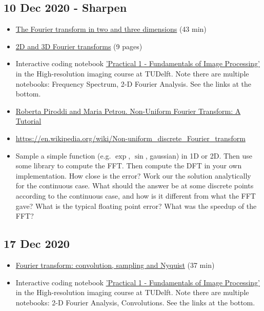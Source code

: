 \documentclass[11pt, oneside]{article}   	%
\begin{document}
\subsection{10 Dec 2020 - Sharpen}
\begin{itemize}
\item \href{https://youtu.be/J1ViNmmQnd0}{The Fourier transform in two and three dimensions} (43 min)
	\item \href{https://cryoemprinciples.yale.edu/sites/default/files/files/4%20Fourier2D-3D.pdf}{2D and 3D Fourier transforms} (9 pages)
	\item Interactive coding notebook \href{https://gitlab.tudelft.nl/aj-lab/teaching/-/wikis/NB4020}{'Practical 1 - Fundamentals of Image Processing'} in the High-resolution imaging course at TUDelft. Note there are multiple notebooks: Frequency Spectrum, 2-D Fourier Analysis. See the links at the bottom.
	\item \href{http://homepages.inf.ed.ac.uk/rbf/CVonline/LOCAL_COPIES/PIRODDI1/NUFT/NUFT.html}{Roberta Piroddi and Maria Petrou. Non-Uniform Fourier Transform: A Tutorial}
	\item \url{https://en.wikipedia.org/wiki/Non-uniform_discrete_Fourier_transform}
	
\end{itemize}
\begin{itemize}
	\item Sample a simple function (e.g. $\exp$, $\sin$, gaussian) in 1D or 2D. Then use some library to compute the FFT. Then compute the DFT in your own implementation. How close is the error? Work our the solution analytically for the continuous case. What should the answer be at some discrete points according to the continuous case, and how is it different from what the FFT gave? What is the typical floating point error? What was the speedup of the FFT?
\end{itemize}

\pagebreak
\subsection{17 Dec 2020}
\begin{itemize}
	\item \href{https://youtu.be/_F-YDwY9X30}{Fourier transform: convolution, sampling and Nyquist} (37 min)
	\item Interactive coding notebook \href{https://gitlab.tudelft.nl/aj-lab/teaching/-/wikis/NB4020}{'Practical 1 - Fundamentals of Image Processing'} in the High-resolution imaging course at TUDelft. Note there are multiple notebooks: 2-D Fourier Analysis, Convolutions. See the links at the bottom.
\end{itemize}
\end{document}
